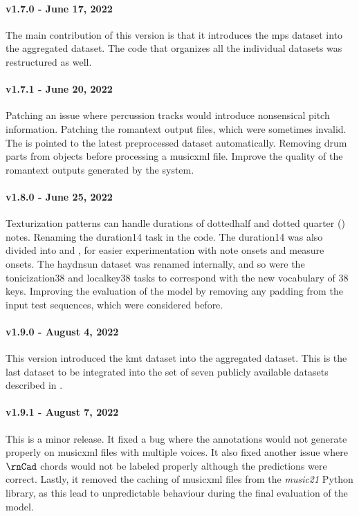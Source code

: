 \paragraph{v1.7.0 - June 17, 2022}
The main contribution of this version is that it introduces
the \gls{mps} dataset into the aggregated dataset. The code
that organizes all the individual datasets was restructured
as well.

\paragraph{v1.7.1 - June 20, 2022}
Patching an issue where percussion tracks would introduce
nonsensical pitch information. Patching the \gls{romantext}
output files, which were sometimes invalid. The
 is pointed to the latest preprocessed dataset
automatically. Removing drum parts from
 objects before processing a
\gls{musicxml} file. Improve the quality of the
\gls{romantext} outputs generated by the system.

\paragraph{v1.8.0 - June 25, 2022}
Texturization patterns can handle durations of \gls{dottedhalf}
and dotted quarter (\musQuarterDotted)
notes. Renaming the \gls{duration14} task in the code. The
\gls{duration14} was also divided into 
and , for easier experimentation with note
onsets and measure onsets. The \gls{haydnsun} dataset was
renamed internally, and so were the \gls{tonicization38} and
\gls{localkey38} tasks to correspond with the new vocabulary
of 38 keys. Improving the evaluation of the model by
removing any padding from the input test sequences, which
were considered before.

\paragraph{v1.9.0 - August 4, 2022}
This version introduced the \gls{kmt} dataset into the
aggregated dataset. This is the last dataset to be
integrated into the set of seven publicly available datasets
described in .

\paragraph{v1.9.1 - August 7, 2022}
This is a minor release. It fixed a bug where the
annotations would not generate properly on \gls{musicxml}
files with multiple voices. It also fixed another issue
where $\rnCad$ chords would not be labeled properly although
the predictions were correct. Lastly, it removed the caching
of \gls{musicxml} files from the \emph{music21} Python
library, as this lead to unpredictable behaviour during the
final evaluation of the model.
